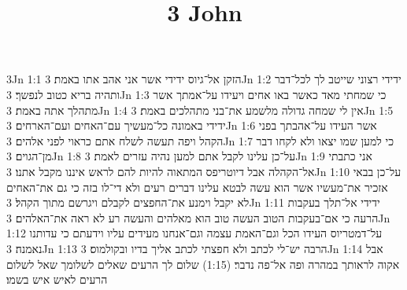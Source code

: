 

\title{3 John}

3Jn 1:1  הזקן אל־גיוס ידידי אשר אני אהב אתו באמת׃
3Jn 1:2  ידידי רצוני שייטב לך לכל־דבר ותהיה בריא כטוב לנפשך׃
3Jn 1:3  כי שמחתי מאד כאשר באו אחים ויעידו על־אמתך אשר מתהלך אתה באמת׃
3Jn 1:4  אין לי שמחה גדולה מלשמע את־בני מתהלכים באמת׃
3Jn 1:5  ידידי באמונה כל־מעשיך עם־האחים ועם־הארחים׃
3Jn 1:6  אשר העידו על־אהבתך בפני הקהל ויפה תעשה לשלח אתם כראוי לפני אלהים׃
3Jn 1:7  כי למען שמו יצאו ולא לקחו דבר מן־הגוים׃
3Jn 1:8  על־כן עלינו לקבל אתם למען נהיה עזרים לאמת׃
3Jn 1:9  אני כתבתי אל־הקהלה אבל דיוטריפס המתאוה להיות להם לראש איננו מקבל אתנו׃
3Jn 1:10  על־כן בבאי אזכיר את־מעשיו אשר הוא עשה לבטא עלינו דברים רעים ולא די־לו בזה כי גם את־האחים לא יקבל וימנע את־החפצים לקבלם ויגרשם מתוך הקהל׃
3Jn 1:11  ידידי אל־תלך בעקבות הרעה כי אם־בעקבות הטוב העשה טוב הוא מאלהים והעשה רע לא ראה את־האלהים׃
3Jn 1:12  על־דמטריוס העידו הכל וגם־האמת עצמה וגם־אנחנו מעידים עליו וידעתם כי עדותנו נאמנה׃
3Jn 1:13  הרבה יש־לי לכתב ולא חפצתי לכתב אליך בדיו ובקולמוס׃
3Jn 1:14  אבל אקוה לראותך במהרה ופה אל־פה נדבר׃ (1:15) שלום לך הרעים שאלים לשלומך שאל לשלום הרעים לאיש איש בשמו׃


